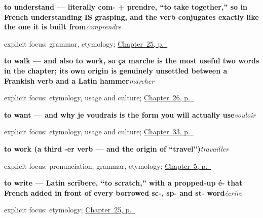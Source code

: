 \noindent\begin{minipage}[t]{\linewidth}
\raggedright
\textbf{to understand — literally com- + prendre, \textquotedblleft{}to take together,\textquotedblright{} so in French understanding IS grasping, and the verb conjugates exactly like the one it is built from}\enspace\emph{comprendre}\par
\footnotesize explicit focus: grammar, etymology; \hyperref[ch:fr-verbs-of-the-mind]{Chapter~25, p.~\pageref*{ch:fr-verbs-of-the-mind}}
\end{minipage}\par\smallskip

\noindent\begin{minipage}[t]{\linewidth}
\raggedright
\textbf{to walk — and also to work, so ça marche is the most useful two words in the chapter; its own origin is genuinely unsettled between a Frankish verb and a Latin hammer}\enspace\emph{marcher}\par
\footnotesize explicit focus: etymology, usage and culture; \hyperref[ch:fr-hearing-sleeping-walking-running]{Chapter~26, p.~\pageref*{ch:fr-hearing-sleeping-walking-running}}
\end{minipage}\par\smallskip

\noindent\begin{minipage}[t]{\linewidth}
\raggedright
\textbf{to want — and why je voudrais is the form you will actually use}\enspace\emph{vouloir}\par
\footnotesize explicit focus: etymology, usage and culture; \hyperref[ch:fr-modaux]{Chapter~33, p.~\pageref*{ch:fr-modaux}}
\end{minipage}\par\smallskip

\noindent\begin{minipage}[t]{\linewidth}
\raggedright
\textbf{to work (a third -er verb — and the origin of \textquotedblleft{}travel\textquotedblright{})}\enspace\emph{travailler}\par
\footnotesize explicit focus: pronunciation, grammar, etymology; \hyperref[ch:first-verbs]{Chapter~5, p.~\pageref*{ch:first-verbs}}
\end{minipage}\par\smallskip

\noindent\begin{minipage}[t]{\linewidth}
\raggedright
\textbf{to write — Latin scrībere, \textquotedblleft{}to scratch,\textquotedblright{} with a propped-up é- that French added in front of every borrowed sc-, sp- and st- word}\enspace\emph{écrire}\par
\footnotesize explicit focus: etymology; \hyperref[ch:fr-verbs-of-the-mind]{Chapter~25, p.~\pageref*{ch:fr-verbs-of-the-mind}}
\end{minipage}\par\smallskip

